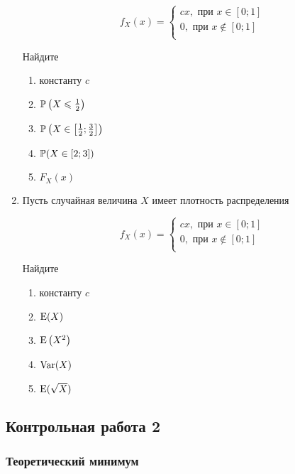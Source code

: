 \begin{enumerate}
\[
f_X(x) =
	\begin{cases}
	cx,\text{ при }  x \in [0; 1] \\
	0,\text{ при } x \notin  [0; 1] \\
	\end{cases}
\]

Найдите
\begin{enumerate}
	\item константу $c$
	\item $\P\left(X \leq \frac{1}{2}\right)$
	\item $\P\left(X \in \left[\frac{1}{2}; \frac{3}{2}\right]\right)$
	\item $\P(X \in [2;3])$
	\item $F_X(x)$
\end{enumerate}

\item Пусть случайная величина $X$ имеет плотность распределения

\[
f_X(x) =
	\begin{cases}
	cx,\text{ при }  x \in [0; 1] \\
	0,\text{ при } x \notin  [0; 1] \\
	\end{cases}
\]

Найдите
\begin{enumerate}
	\item константу $c$
	\item $\E(X)$
	\item $\E\left(X^2\right)$
	\item $\Var(X)$
	\item $\E(\sqrt{X})$
\end{enumerate}
\end{enumerate}

\newpage
\subsection{Контрольная работа 2}
\label{sec:minimum_kr_02}

\subsubsection*{Теоретический минимум}

